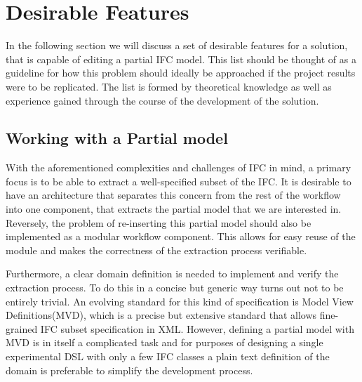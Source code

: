 \section{Desirable Features}
In the following section we will discuss a set of desirable features for a solution, that is capable of editing a partial IFC model. This list should be thought of as a guideline for how this problem should ideally be approached if the project results were to be replicated. The list is formed by theoretical knowledge as well as experience gained through the course of the development of the solution.


\subsection{Working with a Partial model}
With the aforementioned complexities and challenges of IFC in mind, a primary focus is to be able to extract a well-specified subset of the IFC. It is desirable to have an architecture that separates this concern from the rest of the workflow into one component, that extracts the partial model that we are interested in. Reversely, the problem of re-inserting this partial model should also be implemented as a modular workflow component. This allows for easy reuse of the module and makes the correctness of the extraction process verifiable.

Furthermore, a clear domain definition is needed to implement and verify the extraction process. To do this in a concise but generic way turns out not to be entirely trivial. An evolving standard for this kind of specification is Model View Definitions(MVD)\cite{nour08}, which is a precise but extensive standard that allows fine-grained IFC subset specification in XML. However, defining a partial model with MVD is in itself a complicated task and for purposes of designing a single experimental DSL with only a few IFC classes a plain text definition of the domain is preferable to simplify the development process.\cite{mvd}

